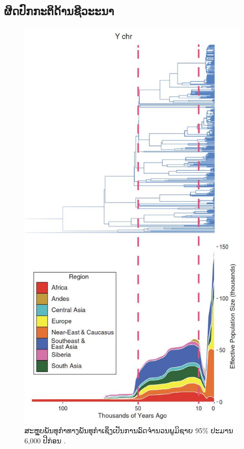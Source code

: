\documentclass[10pt,twocolumn,letterpaper]{article}
\begin{document}
\subsection{ຜິດປົກກະຕິດ້ານຊີວະະນາ}

\begin{figure}[b]
\begin{center}
   \includegraphics[width=1\linewidth]{bottleneck.jpg}
\end{center}
   \caption{ສະຫຼຸບພັນທຸກຳທາງພັນທຸກຳເຊິ່ງເປັນການລົດຈຳນວນພູມິຊາຍ 95\% ປະມານ 6,000 ປີກ່ອນ \cite{62}.}
\label{fig:10}
\label{fig:onecol}
\end{figure}
\end{document}
